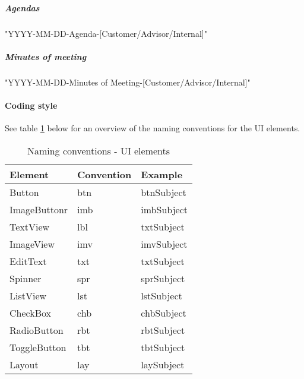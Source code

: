 \subparagraph{Agendas}\hfill
\newline
"YYYY-MM-DD-Agenda-[Customer/Advisor/Internal]"

\subparagraph{Minutes of meeting}\hfill
\newline
"YYYY-MM-DD-Minutes of Meeting-[Customer/Advisor/Internal]"

\newpage

\paragraph{Coding style}\hfill
\newline
See table \ref{tab:namingconventions} below for an overview of the naming conventions for the UI elements.
\begin{table}[h!]
\begin{center}
\begin{tabular}{l|l|l} \hline
\textbf{Element} & \textbf{Convention} & \textbf{Example} \\ \hline \hline
Button & btn & btnSubject \\
ImageButtonr & imb & imbSubject \\
TextView & lbl & txtSubject \\
ImageView & imv & imvSubject \\
EditText & txt & txtSubject \\
Spinner & spr & sprSubject \\
ListView & lst & lstSubject \\
CheckBox & chb & chbSubject \\
RadioButton & rbt & rbtSubject \\
ToggleButton & tbt & tbtSubject \\
Layout & lay & laySubject \\ \hline 
\end{tabular}
\end{center}
\caption{Naming conventions - UI elements}\label{tab:namingconventions}
\end{table}


